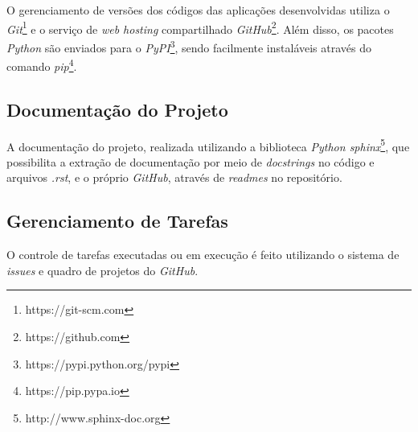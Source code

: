 O gerenciamento de versões dos códigos das aplicações desenvolvidas utiliza o \textit{Git}\footnote{https://git-scm.com} e o serviço de \textit{web hosting} compartilhado \textit{GitHub}\footnote{https://github.com}. Além disso, os pacotes \textit{Python} são enviados para o \textit{PyPI}\footnote{https://pypi.python.org/pypi}, sendo facilmente instaláveis através do comando \textit{pip}\footnote{https://pip.pypa.io}.


\subsection{Documentação do Projeto}

A documentação do projeto, realizada utilizando a biblioteca \textit{Python sphinx}\footnote{http://www.sphinx-doc.org}, que possibilita a extração de documentação por meio de \textit{docstrings} no código e arquivos \textit{.rst}, e o próprio \textit{GitHub}, através de \textit{readmes} no repositório.

\subsection{Gerenciamento de Tarefas}

O controle de tarefas executadas ou em execução é feito utilizando o sistema de \textit{issues} e quadro de projetos do \textit{GitHub}.


